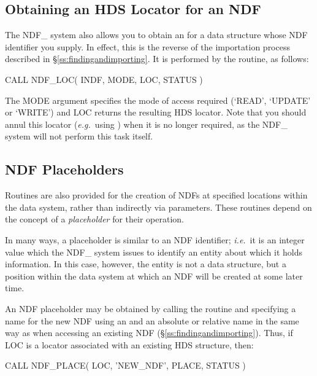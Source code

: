 \documentclass[twoside,11pt,nolof]{starlink}
\providecommand{\st}[1]{{\emph{#1}}}
\begin{document}
\subsection{\label{ss:gettingalocator}Obtaining an HDS Locator for an NDF}

The NDF\_ system also allows you to obtain an  for a data structure whose NDF
identifier you supply. In effect, this is the reverse of the
importation process described in \S\ref{ss:findingandimporting}. It is
performed by the  routine, as follows:

\small
\begin{terminalv}
      CALL NDF_LOC( INDF, MODE, LOC, STATUS )
\end{terminalv}
\normalsize

The MODE argument specifies the mode of access required (`READ', `UPDATE' or
`WRITE') and LOC returns the resulting HDS locator. Note that you should annul
this locator (\st{e.g.}\ using )
when it is no longer required, as the NDF\_ system will not perform
this task itself.

\subsection{\label{ss:placeholders}NDF Placeholders}

Routines are also provided for the creation of NDFs at specified locations
within the data system, rather than indirectly via parameters.
These routines depend on the concept of a \st{placeholder\/} for their
operation.

In many ways, a placeholder is similar to an NDF identifier; \st{i.e.}\ it
is an integer value which the NDF\_ system issues to identify an entity
about which it holds information.
In this case, however, the entity is not a data structure, but a position
within the data system at which an NDF will be created at some later time.

An NDF placeholder may be obtained by calling the routine 
and specifying a name for the new NDF using an  and an absolute or relative name in
the same way as when accessing an existing NDF
(\S\ref{ss:findingandimporting}). Thus, if LOC is a locator associated
with an existing HDS structure, then:

\small
\begin{terminalv}
      CALL NDF_PLACE( LOC, 'NEW_NDF', PLACE, STATUS )
\end{terminalv}
\normalsize
\end{document}
